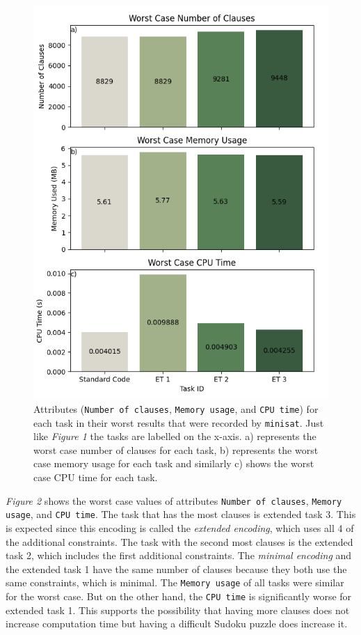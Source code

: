 \documentclass[12pt]{article}
\begin{document}
\begin{figure}[hbt!]
	\centering
	\includegraphics[scale=0.5]{worst_case}
	\caption{Attributes (\texttt{Number of clauses}, \texttt{Memory usage}, and \texttt{CPU time}) for each task in their worst results that were recorded by \texttt{minisat}. Just like \textit{Figure 1} the tasks are labelled on the x-axis. a) represents the worst case number of clauses for each task, b) represents the worst case memory usage for each task and similarly c) shows the worst case CPU time for each task.}
\end{figure}

\textit{Figure 2} shows the worst case values of attributes \texttt{Number of clauses}, \texttt{Memory usage}, and \texttt{CPU time}. The task that has the most clauses is extended task 3. This is expected since this encoding is called the \textit{extended encoding}, which uses all 4 of the additional constraints. The task with the second most clauses is the extended task 2, which includes the first additional constraints. The \textit{minimal encoding} and the extended task 1 have the same number of clauses because they both use the same constraints, which is minimal. The \texttt{Memory usage} of all tasks were similar for the worst case. But on the other hand, the \texttt{CPU time} is significantly worse for extended task 1. This supports the possibility that having more clauses does not increase computation time but having a difficult Sudoku puzzle does increase it.
\end{document}
